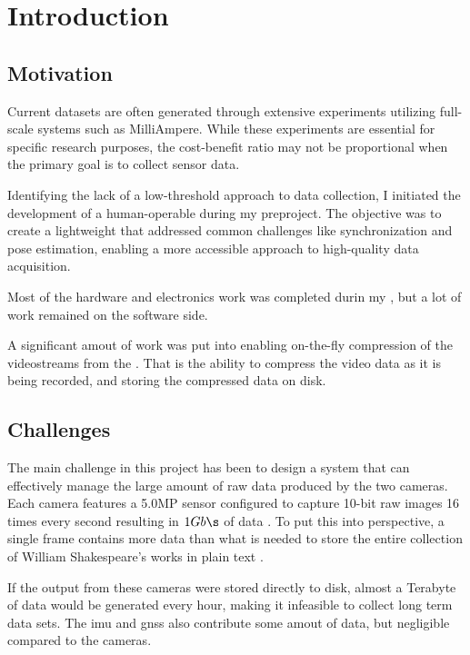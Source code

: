 \chapter{Introduction}

\section{Motivation}
Current datasets are often generated through extensive experiments utilizing full-scale systems such as MilliAmpere. While these experiments are essential for specific research purposes, the cost-benefit ratio may not be proportional when the primary goal is to collect sensor data.

Identifying the lack of a low-threshold approach to data collection, I initiated the development of a human-operable \sr during my preproject. The objective was to create a lightweight \sr that addressed common challenges like synchronization and pose estimation, enabling a more accessible approach to high-quality data acquisition.

Most of the hardware and electronics work was completed durin my \preproject, but a lot of work remained on the software side.

A significant amout of work was put into enabling on-the-fly compression of the videostreams from the \sr.
That is the ability to compress the video data as it is being recorded, and storing the compressed data on disk.

\section{Challenges}
The main challenge in this project has been to design a system that can effectively manage the large amount of raw data produced by the two cameras.
Each camera features a 5.0MP sensor configured to capture 10-bit raw images 16 times every second resulting in $1Gb\s$ of data \cite{lucidvisionlabsTriton0MPPolarization}.
To put this into perspective, a single frame contains more data than what is needed to store the entire collection of William Shakespeare's works in plain text \cite{projectgutenbergCompleteWorksWilliam1994}.

If the output from these cameras were stored directly to disk, almost a Terabyte of data would be generated every hour, making it infeasible to collect long term data sets.
The \gls{imu} and \gls{gnss} also contribute some amout of data, but negligible compared to the cameras.


